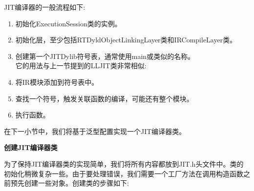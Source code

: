 JIT编译器的一般流程如下:\par

\begin{enumerate}
\item 初始化ExecutionSession类的实例。
\item 初始化层，至少包括RTDyldObjectLinkingLayer类和IRCompileLayer类。
\item 创建第一个JITDylib符号表，通常使用main或类似的名称。
\\它的用法与上一节提到的LLJIT类非常相似:
\item 将IR模块添加到符号表中。
\item 查找一个符号，触发关联函数的编译，可能还有整个模块。
\item 执行函数。
\end{enumerate}

在下一小节中，我们将基于泛型配置实现一个JIT编译器类。\par

\hspace*{\fill} \par %
\textbf{创建JIT编译器类}

为了保持JIT编译器类的实现简单，我们将所有内容都放到JIT.h头文件中。类的初始化稍微复杂一些。由于要处理错误，我们需要一个工厂方法在调用构造函数之前预先创建一些对象。创建类的步骤如下:\par


